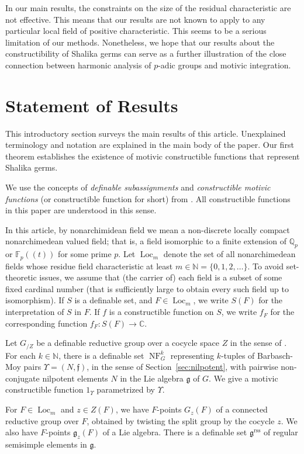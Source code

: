 \documentclass[12pt]{amsart}
\newcommand{\op}[1]{\operatorname{#1}}
\newcommand{\ring}[1]{{\mathbb #1}}
\def\NF{\op{NF}}
\def\Y{\Upsilon}
\def\s{{\mathfrak{f}}}
\newcommand{\fg}{\mathfrak{g}}
\newcommand{\reg}{\mathrm{rss}}
\theoremstyle{plain}
\theoremstyle{definition}
\begin{document}
In our main results, the constraints on the size of the residual
characteristic are not effective.  This means that our results are not
known to apply to any particular local field of positive
characteristic. This seems to be a serious limitation of our methods.
Nonetheless, we hope that our results about the constructibility of
Shalika germs can serve as a further illustration of the close
connection between harmonic analysis of $p$-adic groups and motivic
integration.

\section{Statement of Results}


This introductory section surveys the main results of this article.
Unexplained terminology and notation are explained in the main body of
the paper.  Our first theorem establishes the existence of motivic
constructible functions that represent Shalika germs.

We use the concepts of {\it definable subassignments} and {\it
  constructible motivic functions} (or constructible function for
short) from \cite{CL}.  All constructible functions in this paper are
understood in this sense.  

In this article, by nonarchimidean field we mean a non-discrete
locally compact nonarchimedean valued field; that is, a field
isomorphic to a finite extension of $\ring{Q}_p$ or $\ring{F}_p((t))$
for some prime $p$.  Let $\op{Loc}_m$ denote the set of all
nonarchimedean fields whose residue field characteristic at least
$m\in \ring{N}=\{0,1,2,\ldots\}$.  To avoid set-theoretic issues, we
assume that (the carrier of) each field is a subset of some fixed
cardinal number (that is sufficiently large to obtain every such field
up to isomorphism).  If $S$ is a definable set, and $F\in \op{Loc}_m$,
we write $S(F)$ for the interpretation of $S$ in $F$.  If $f$ is a
constructible function on $S$, we write $f_F$ for the corresponding
function $f_F:S(F)\to \ring{C}$.

Let $G_{/Z}$ be a definable reductive group over a cocycle space $Z$
in the sense of \cite{CGH}.  For each $k\in\ring{N}$, there is a
definable set $\NF^k_G$ representing $k$-tuples of Barbasch-Moy
pairs $\Y=(N,\s)$, in the sense of Section~\ref{sec:nilpotent}, with
pairwise non-conjugate nilpotent elements $N$ in the Lie algebra $\fg$
of $G$.  We give a motivic constructible function $1_\Y$
parametrized by $\Y$.

For $F\in \op{Loc}_m$ and $z\in Z(F)$, we have $F$-points $G_z(F)$ of
a connected reductive group over $F$, obtained by twisting the split
group by the cocycle $z$. We also have $F$-points $\fg_z(F)$ of a Lie
algebra. There is a definable set $\fg^\reg$ of regular semisimple
elements in $\fg$.
\end{document}
